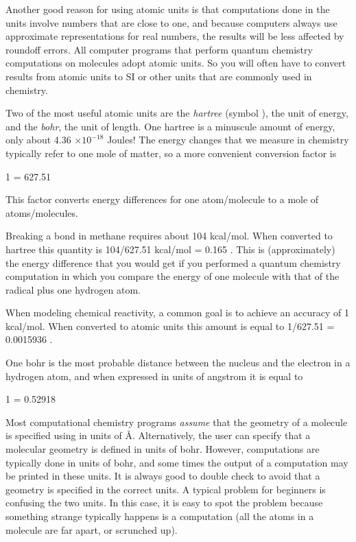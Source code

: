 \documentclass[../Main/chem371-notes.tex]{subfiles}
\begin{document}
Another good reason for using atomic units is that computations done in the units involve numbers that are close to one, and because computers always use approximate representations for real numbers, the results will be less affected by roundoff errors.
All computer programs that perform quantum chemistry computations on molecules adopt atomic units.
So you will often have to convert results from atomic units to SI or other units that are commonly used in chemistry.

Two of the most useful atomic units are the \emph{hartree} (symbol  \Eh), the unit of energy, and the \emph{bohr}, the unit of length.
One hartree is a minuscule amount of energy, only about 4.36 $\times 10^{-18}$ Joules!
The energy changes that we measure in chemistry typically refer to one mole of matter, so a more convenient conversion factor is 
\begin{iequation}
1  = 627.51 
\end{iequation}
This factor converts energy differences for one atom/molecule to a mole of atoms/molecules.

\begin{example}
Breaking a  bond in methane requires about 104 kcal/mol. When converted to hartree this quantity is 104/627.51 kcal/mol = 0.165 \Eh.
This is (approximately) the energy difference that you would get if you performed a quantum chemistry computation in which you compare the energy of one  molecule with that of the  radical plus one hydrogen atom.
\end{example}

\begin{example}
When modeling chemical reactivity, a common goal is to achieve an accuracy of 1 kcal/mol. When converted to atomic units this amount is equal to 1/627.51 \Eh = 0.0015936 \Eh.
\end{example}

One bohr is the most probable distance between the nucleus and the electron in a hydrogen atom, and when expressed in units of angstrom it is equal to
\begin{iequation}
1  = 0.52918 \text{ \AA{}}
\end{iequation}
Most computational chemistry programs \emph{assume} that the geometry of a molecule is specified using in units of \AA{}.
Alternatively, the user can specify that a molecular geometry is defined in units of bohr.
However, computations are typically done in units of bohr, and some times the output of a computation may be printed in these units.
It is always good to double check to avoid that a geometry is specified in the correct units.
A typical problem for beginners is confusing the two units.
In this case, it is easy to spot the problem because something strange typically happens is a computation (all the atoms in a molecule are far apart, or scrunched up).
\end{document}
